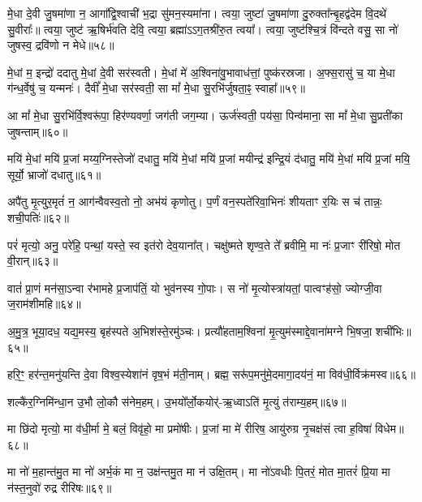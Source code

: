 मे॒धा दे॒वी जु॒षमा॑णा न॒ आगा᳚द्वि॒श्वाची॑ भ॒द्रा सु॑मन॒स्यमा॑ना। 
त्वया॒ जुष्टा॑ जु॒षमा॑णा दु॒रुक्ता᳚न्बृ॒हद्व॑देम वि॒दथे॑ सु॒वीराः᳚॥ 
त्वया॒ जुष्ट॑ ऋ॒षिर्भ॑वति देवि॒ त्वया॒ ब्रह्मा॑ऽऽग॒तश्री॑रु॒त त्वया᳚। 
त्वया॒ जुष्ट॑श्चि॒त्रं वि॑न्दते वसु॒ सा नो॑ जुषस्व॒ द्रवि॑णो न मेधे॥५८॥
\anuvakamend


मे॒धां म॒ इन्द्रो॑ ददातु मे॒धां दे॒वी सर॑स्वती। 
मे॒धां मे॑ अ॒श्विना॑वु॒भावाध॑त्तां॒ पुष्क॑रस्रजा। 
अ॒फ्स॒रासु॑ च॒ या मे॒धा ग॑न्ध॒र्वेषु॑ च॒ यन्मनः॑। 
दैवीं᳚ मे॒धा सर॑स्वती॒ सा मां᳚ मे॒धा सु॒रभि॑र्जुषता॒ꣴ॒ स्वाहा᳚॥५९॥
\anuvakamend


आ मां᳚ मे॒धा सु॒रभि॑र्वि॒श्वरू॑पा॒ हिर॑ण्यवर्णा॒ जग॑ती जग॒म्या। 
ऊर्ज॑स्वती॒ पय॑सा॒ पिन्व॑माना॒ सा मां᳚ मे॒धा सु॒प्रती॑का जुषन्ताम्॥६०॥ 
\anuvakamend

मयि॑ मे॒धां मयि॑ प्र॒जां मय्य॒ग्निस्तेजो॑ दधातु॒ मयि॑ मे॒धां मयि॑ प्र॒जां मयीन्द्र॑ इन्द्रि॒यं द॑धातु॒ मयि॑ मे॒धां मयि॑ प्र॒जां मयि॒ सूर्यो॒ भ्राजो॑ दधातु॥६१॥ 
\anuvakamend


अपै॑तु मृ॒त्युर॒मृतं॑ न॒ आग॑न्वैवस्व॒तो नो॒ अभ॑यं कृणोतु। 
प॒र्णं वन॒स्पते॑रिवा॒भिनः॑ शीयताꣳ र॒यिः स च॑ तान्नः॒ शची॒पतिः॑॥६२॥%
\anuvakamend

 परं॑ मृत्यो॒ अनु॒ परे॑हि॒ पन्थां॒ यस्ते॒ स्व इत॑रो देव॒याना᳚त्। 
 चक्षु॑ष्मते शृण्व॒ते ते᳚ ब्रवीमि॒ मा नः॑ प्र॒जाꣳ री॑रिषो॒ मोत वी॒रान्॥६३॥%
 \anuvakamend
 
 वातं॑ प्रा॒णं मन॑सा॒ऽन्वा र॑भामहे प्र॒जाप॑तिं॒ यो भुव॑नस्य गो॒पाः। 
 स नो॑ मृ॒त्योस्त्रा॑यतां॒ पात्वꣳह॑सो॒ ज्योग्जी॒वा ज॒राम॑शीमहि॥६४॥
 \anuvakamend
 
 अ॒मु॒त्र॒ भूया॒दध॒ यद्य॒मस्य॒ बृह॑स्पते अ॒भिश॑स्ते॒रमु॑ञ्चः। 
 प्रत्यौ॑हताम॒श्विना॑ मृ॒त्युम॑स्माद्दे॒वाना॑मग्ने भि॒षजा॒ शची॑भिः॥६५॥
 \anuvakamend
 
 हरि॒ꣳ॒ हर॑न्त॒मनु॑यन्ति दे॒वा विश्व॒स्येशा॑नं वृष॒भं म॑ती॒नाम्। 
 ब्रह्म॒ सरू॑प॒मनु॑मे॒दमागा॒दय॑नं॒ मा विव॑धी॒र्विक्र॑मस्व॥६६॥
 \anuvakamend
 
 शल्कै॑र॒ग्निमि॑न्धा॒न उ॒भौ लो॒कौ स॑नेम॒हम्। 
 उ॒भयो᳚र्लो॒कयोर्॑-ऋ॒ध्वाऽति॑ मृ॒त्युं त॑राम्य॒हम्॥६७॥
\anuvakamend
 
मा छि॑दो मृत्यो॒ मा व॑धी॒र्मा मे॒ बलं॒ विवृ॑हो॒ मा प्रमो॑षीः। 
प्र॒जां मा मे॑ रीरिष॒ आयु॑रुग्र नृ॒चक्ष॑सं त्वा ह॒विषा॑ विधेम॥६८॥
\anuvakamend
 
मा नो॑ म॒हान्त॑मु॒त मा नो॑ अर्भ॒कं मा न॒ उक्ष॑न्तमु॒त मा न॑ उक्षि॒तम्। 
मा नो॑ऽवधीः पि॒तरं॒ मोत मा॒तरं॑ प्रि॒या मा न॑स्त॒नुवो॑ रुद्र रीरिषः॥६९॥
\anuvakamend

